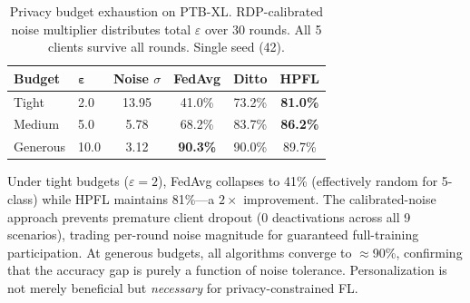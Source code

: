 \documentclass[conference]{IEEEtran}
\begin{document}
\begin{table}[htbp]
\centering
\caption{Privacy budget exhaustion on PTB-XL. RDP-calibrated noise multiplier distributes total $\varepsilon$ over 30 rounds. All 5 clients survive all rounds. Single seed (42).}
\label{tab:budget_exhaustion}
\small
\begin{tabular}{llcccc}
\toprule
\textbf{Budget} & $\boldsymbol{\varepsilon}$ & \textbf{Noise $\sigma$} & \textbf{FedAvg} & \textbf{Ditto} & \textbf{HPFL} \\
\midrule
Tight & 2.0 & 13.95 & 41.0\% & 73.2\% & \textbf{81.0\%} \\
Medium & 5.0 & 5.78 & 68.2\% & 83.7\% & \textbf{86.2\%} \\
Generous & 10.0 & 3.12 & \textbf{90.3\%} & 90.0\% & 89.7\% \\
\bottomrule
\end{tabular}

\vspace{1mm}
\footnotesize{Under tight budgets ($\varepsilon{=}2$), FedAvg collapses to 41\% (effectively random for 5-class) while HPFL maintains 81\%---a $2\times$ improvement. The calibrated-noise approach prevents premature client dropout (0 deactivations across all 9 scenarios), trading per-round noise magnitude for guaranteed full-training participation. At generous budgets, all algorithms converge to $\approx$90\%, confirming that the accuracy gap is purely a function of noise tolerance. Personalization is not merely beneficial but \textit{necessary} for privacy-constrained FL.}
\end{table}

\end{document}
